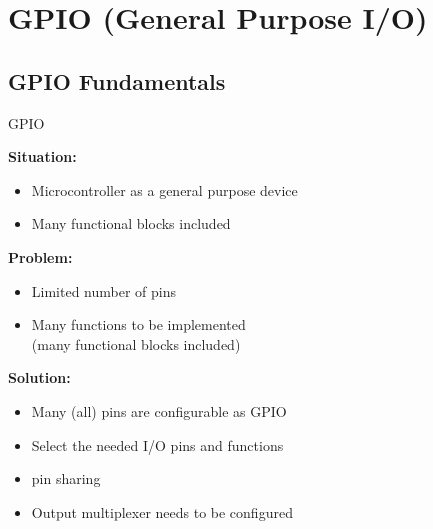 \section{GPIO (General Purpose I/O)}

\subsection{GPIO Fundamentals}

\begin{definition}{GPIO}\\
    \begin{minipage}{0.5\linewidth}
    \textbf{Situation:}
    \begin{itemize}
        \item Microcontroller as a general purpose device
        \item Many functional blocks included
    \end{itemize}

    \textbf{Problem:}
    \begin{itemize}
        \item Limited number of pins
        \item Many functions to be implemented \\ (many functional blocks included)
    \end{itemize}
    \end{minipage}
    \begin{minipage}{0.5\linewidth}

    \textbf{Solution:}
    \begin{itemize}
        \item Many (all) pins are configurable as GPIO
        \item Select the needed I/O pins and functions
        \item \oq pin sharing\cq
        \item Output multiplexer needs to be configured
    \end{itemize}
    \end{minipage}
\end{definition}



